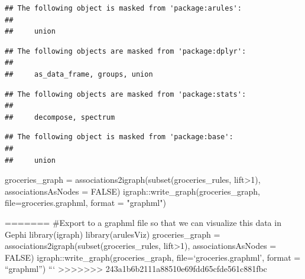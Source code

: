 \documentclass[
]{article}
\newenvironment{Shaded}{\begin{snugshade}}{\end{snugshade}}
\newcommand{\AttributeTok}[1]{\textcolor[rgb]{0.77,0.63,0.00}{#1}}
\newcommand{\ConstantTok}[1]{\textcolor[rgb]{0.00,0.00,0.00}{#1}}
\newcommand{\DecValTok}[1]{\textcolor[rgb]{0.00,0.00,0.81}{#1}}
\newcommand{\FunctionTok}[1]{\textcolor[rgb]{0.00,0.00,0.00}{#1}}
\newcommand{\NormalTok}[1]{#1}
\newcommand{\OtherTok}[1]{\textcolor[rgb]{0.56,0.35,0.01}{#1}}
\newcommand{\SpecialCharTok}[1]{\textcolor[rgb]{0.00,0.00,0.00}{#1}}
\newcommand{\StringTok}[1]{\textcolor[rgb]{0.31,0.60,0.02}{#1}}
\begin{document}
\begin{verbatim}
## The following object is masked from 'package:arules':
## 
##     union
\end{verbatim}

\begin{verbatim}
## The following objects are masked from 'package:dplyr':
## 
##     as_data_frame, groups, union
\end{verbatim}

\begin{verbatim}
## The following objects are masked from 'package:stats':
## 
##     decompose, spectrum
\end{verbatim}

\begin{verbatim}
## The following object is masked from 'package:base':
## 
##     union
\end{verbatim}

\begin{Shaded}
\begin{Highlighting}[]
\NormalTok{groceries\_graph }\OtherTok{=} \FunctionTok{associations2igraph}\NormalTok{(}\FunctionTok{subset}\NormalTok{(groceries\_rules, lift}\SpecialCharTok{\textgreater{}}\DecValTok{1}\NormalTok{), }\AttributeTok{associationsAsNodes =} \ConstantTok{FALSE}\NormalTok{)}
\NormalTok{igraph}\SpecialCharTok{::}\FunctionTok{write\_graph}\NormalTok{(groceries\_graph, }\AttributeTok{file=}\StringTok{\textquotesingle{}groceries.graphml\textquotesingle{}}\NormalTok{, }\AttributeTok{format =} \StringTok{"graphml"}\NormalTok{)}
\end{Highlighting}
\end{Shaded}

======= \#Export to a graphml file so that we can visualize this data in
Gephi library(igraph) library(arulesViz) groceries\_graph =
associations2igraph(subset(groceries\_rules, lift\textgreater1),
associationsAsNodes = FALSE) igraph::write\_graph(groceries\_graph,
file=`groceries.graphml', format = ``graphml'') ```
\textgreater\textgreater\textgreater\textgreater\textgreater\textgreater\textgreater{}
243a1b6b2111a88510e69fdd65cfde561c881fbc
\end{document}
